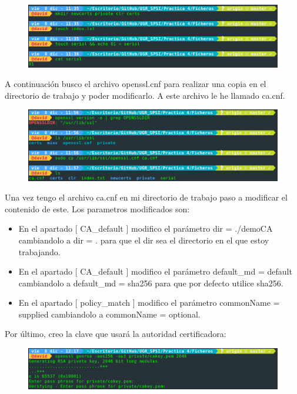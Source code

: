 \documentclass[10pt,a4paper,spanish]{report}
\begin{document}
\begin{figure}[!hbp]
 \centering  \includegraphics[width=1\textwidth]{./Imagenes/1_1.png}
\end{figure}

\noindent
A continuación busco el archivo openssl.cnf para realizar una copia en el directorio de trabajo y poder modificarlo. A este archivo le he llamado ca.cnf.

\begin{figure}[!hbp]
 \centering  \includegraphics[width=1\textwidth]{./Imagenes/1_2.png}
\end{figure}

\noindent
Una vez tengo el archivo ca.cnf en mi directorio de trabajo paso a modificar el contenido de este. Los parametros modificados son:

\begin{itemize}
 \item En el apartado [ CA\_default ] modifico el parámetro dir	= ./demoCA cambiandolo a dir	= . para que el dir sea el directorio en el que estoy trabajando.
 \item En el apartado [ CA\_default ] modifico el parámetro default\_md	= default cambiandolo a default\_md	= sha256 para que por defecto utilice sha256.
 \item En el apartado [ policy\_match ] modifico el parámetro commonName	= supplied cambiandolo a commonName	= optional.
\end{itemize}

\newpage
\noindent
Por último, creo la clave que usará la autoridad certificadora:

\begin{figure}[!hbp]
 \centering  \includegraphics[width=1\textwidth]{./Imagenes/1_3.png}
\end{figure}
\end{document}
